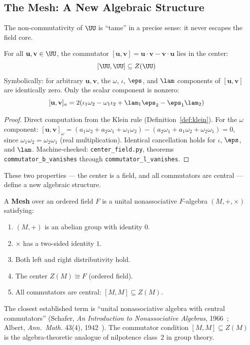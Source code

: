 
\subsection{The Mesh: A New Algebraic Structure}\label{sec:mesh}

The non-commutativity of $\UU$ is ``tame'' in a precise sense: it never escapes the field core.

\begin{theorem}{\label{thm:mesh-condition}}
For all $\mathbf{u}, \mathbf{v} \in \UU$, the commutator $[\mathbf{u}, \mathbf{v}] = \mathbf{u} \cdot \mathbf{v} - \mathbf{v} \cdot \mathbf{u}$ lies in the center:
$$[\UU, \UU] \subseteq Z(\UU)$$
Symbolically: for arbitrary $\mathbf{u}, \mathbf{v}$, the $\omega$, $\iota$, $\eps$, and $\lam$ components of $[\mathbf{u}, \mathbf{v}]$ are identically zero. Only the scalar component is nonzero:
$$[\mathbf{u}, \mathbf{v}]_a = 2(\iota_1 \omega_2 - \omega_1 \iota_2 + \lam_1 \eps_2 - \eps_1 \lam_2)$$
\end{theorem}

\begin{proof}
Direct computation from the Klein rule (Definition~\ref{def:klein}). For the $\omega$ component:
$[\mathbf{u}, \mathbf{v}]_\omega = (a_1 \omega_2 + a_2 \omega_1 + \omega_1 \omega_2) - (a_2 \omega_1 + a_1 \omega_2 + \omega_2 \omega_1) = 0$,
since $\omega_1 \omega_2 = \omega_2 \omega_1$ (real multiplication). Identical cancellation holds for $\iota$, $\eps$, and $\lam$. Machine-checked: \texttt{center\_field.py}, theorems \texttt{commutator\_b\_vanishes} through \texttt{commutator\_l\_vanishes}. \qedhere
\end{proof}

These two properties --- the center is a field, and all commutators are central --- define a new algebraic structure.

\begin{definition}[Mesh]\label{def:mesh}
A \textbf{Mesh} over an ordered field $F$ is a unital nonassociative $F$-algebra $(M, +, \times)$ satisfying:
\begin{enumerate}
\item[(M1)] $(M, +)$ is an abelian group with identity $0$.
\item[(M2)] $\times$ has a two-sided identity $1$.
\item[(M3--4)] Both left and right distributivity hold.
\item[(M5)] The center $Z(M) \cong F$ (ordered field).
\item[(M6)] All commutators are central: $[M, M] \subseteq Z(M)$.
\end{enumerate}
The closest established term is ``unital nonassociative algebra with central commutators'' (Schafer, \emph{An Introduction to Nonassociative Algebras}, 1966~\cite{schafer}; Albert, \emph{Ann.\ Math.} 43(4), 1942~\cite{albert}). The commutator condition $[M, M] \subseteq Z(M)$ is the algebra-theoretic analogue of nilpotence class~2 in group theory.
\end{definition}

